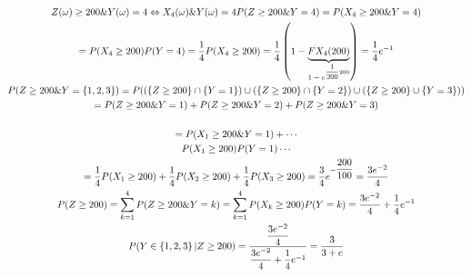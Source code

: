 \begin{equation*}
  \begin{gathered}
    Z(\omega)\geq200\& Y(\omega) = 4\Leftrightarrow X_4(\omega)\& Y(\omega) = 4
    P(Z\geq200\& Y=4) = P(X_4\geq200\& Y=4)\\
    = P(X_4\geq200)P(Y=4)=\dfrac{1}{4}P(X_4\geq200) = \dfrac{1}{4}\left(1-\underbrace{F{X_4}(200)}_{\text{$1-e^{\dfrac{1}{200}200}$}}\right) = \dfrac{1}{4}e^{-1}\\
  P(Z\geq200\& Y= \left\{1,2,3\right\}) = P((\left\{Z\geq200\right\}\cap\left\{Y=1\right\})\cup(\left\{Z\geq200\right\}\cap\left\{Y=2\right\})\cup(\left\{Z\geq200\right\}\cup\left\{Y=3\right\}))\\
  = P(Z\geq200 \& Y=1)+P(Z\geq200\& Y=2)+P(Z\geq200\& Y=3)\\\\
  = P(X_1\geq200\& Y=1)+\cdots\\
  P(X_1\geq200)P(Y=1)\cdots\\
  =\dfrac{1}{4}P(X_1\geq200)+\dfrac{1}{4}P(X_2\geq200)+\dfrac{1}{4}P(X_3\geq200) = \dfrac{3}{4}e^{-\dfrac{200}{100}}=\dfrac{3e^{-2}}{4}\\
  P(Z\geq200) = \sum_{k=1}^{4}P(Z\geq200\& Y=k) = \sum_{k=1}^{4}P(X_k\geq200)P(Y=k) = \dfrac{3e^{-2}}{4}+\dfrac{1}{4}e^{-1}\\
  P(Y\in\left\{1,2,3\right\}|Z\geq200) = \dfrac{\dfrac{3e^{-2}}{4}}{\dfrac{3e^{-2}}{4}+\dfrac{1}{4}e^{-1}} = \dfrac{3}{3+e}
  \end{gathered}
\end{equation*}
\par\bigskip
